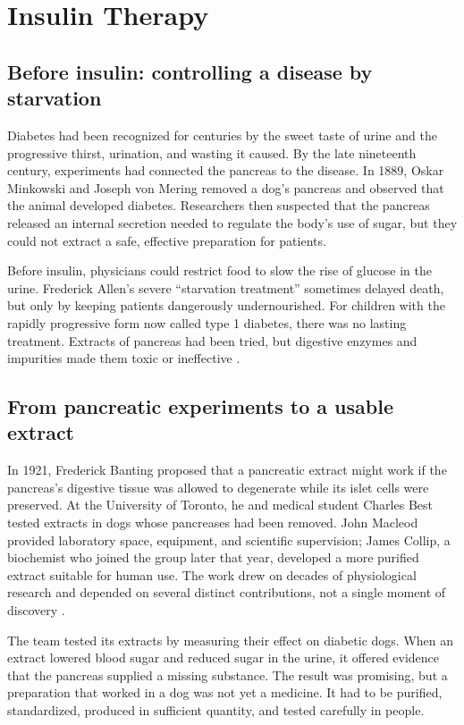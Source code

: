 \documentclass[12pt,oneside]{book}
\begin{document}
\chapter[Insulin Therapy]{Insulin Therapy}

\section{Before insulin: controlling a disease by starvation}
Diabetes had been recognized for centuries by the sweet taste of urine and the
progressive thirst, urination, and wasting it caused. By the late nineteenth
century, experiments had connected the pancreas to the disease. In 1889, Oskar
Minkowski and Joseph von Mering removed a dog's pancreas and observed that the
animal developed diabetes. Researchers then suspected that the pancreas
released an internal secretion needed to regulate the body's use of sugar, but
they could not extract a safe, effective preparation for patients.

Before insulin, physicians could restrict food to slow the rise of glucose in
the urine. Frederick Allen's severe ``starvation treatment'' sometimes delayed
death, but only by keeping patients dangerously undernourished. For children
with the rapidly progressive form now called type 1 diabetes, there was no
lasting treatment. Extracts of pancreas had been tried, but digestive enzymes
and impurities made them toxic or ineffective \cite{fdaInsulinHistory}.

\section{From pancreatic experiments to a usable extract}
In 1921, Frederick Banting proposed that a pancreatic extract might work if the
pancreas's digestive tissue was allowed to degenerate while its islet cells
were preserved. At the University of Toronto, he and medical student Charles
Best tested extracts in dogs whose pancreases had been removed. John Macleod
provided laboratory space, equipment, and scientific supervision; James
Collip, a biochemist who joined the group later that year, developed a more
purified extract suitable for human use. The work drew on decades of
physiological research and depended on several distinct contributions, not a
single moment of discovery \cite{niddkinsulin,macleodinsulin}.

The team tested its extracts by measuring their effect on diabetic dogs. When
an extract lowered blood sugar and reduced sugar in the urine, it offered
evidence that the pancreas supplied a missing substance. The result was
promising, but a preparation that worked in a dog was not yet a medicine. It
had to be purified, standardized, produced in sufficient quantity, and tested
carefully in people.
\end{document}
